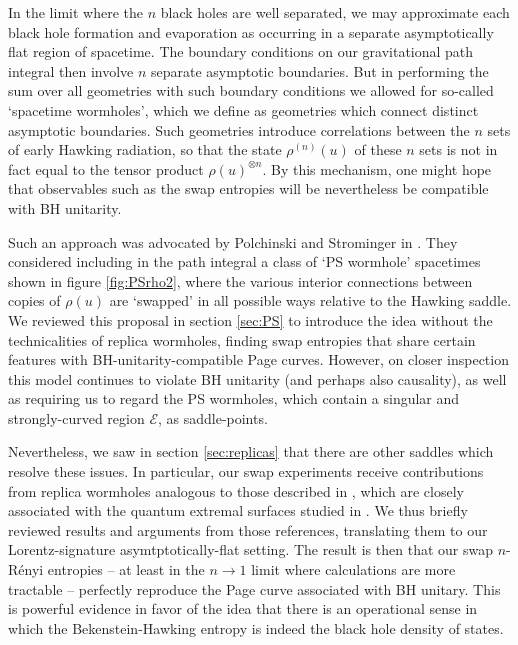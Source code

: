 \documentclass[letterpaper,12pt]{article}
\newcommand*{\evap}{\mathscr{E}} %
\begin{document}
In the limit where the $n$ black holes are well separated, we may approximate each black hole formation and evaporation as occurring in a separate asymptotically flat region of spacetime. The boundary conditions on our gravitational path integral then involve $n$ separate asymptotic boundaries. But in performing the sum over all geometries with such boundary conditions we allowed for so-called `spacetime wormholes', which we define as geometries which connect distinct asymptotic boundaries. Such geometries introduce correlations between the $n$ sets of early Hawking radiation, so that the state $\rho^{(n)}(u)$ of these $n$ sets is not in fact equal to the tensor product $\rho(u)^{\otimes n}$. By this mechanism, one might hope that observables such as the swap entropies will be nevertheless be compatible with BH unitarity.

Such an approach was advocated by Polchinski and Strominger in \cite{Polchinski:1994zs}. They considered including in the path integral a class of `PS wormhole' spacetimes shown in figure \ref{fig:PSrho2}, where the various interior connections between copies of $\rho(u)$ are `swapped' in all possible ways relative to the Hawking saddle. We reviewed this proposal in section \ref{sec:PS} to introduce the idea without the technicalities of replica wormholes, finding swap entropies that share certain features with BH-unitarity-compatible Page curves. However, on closer inspection this model continues to violate BH unitarity (and perhaps also causality), as well as requiring us to regard the PS wormholes, which contain a singular and strongly-curved region $\evap$, as saddle-points.

Nevertheless, we saw in section \ref{sec:replicas} that there are other saddles which resolve these issues.  In particular, our swap experiments receive contributions from replica wormholes analogous to those described in \cite{Almheiri:2019qdq,Penington:2019kki}, which are closely associated with the quantum extremal surfaces studied in \cite{Almheiri:2019psf,Penington:2019npb}.  We thus briefly reviewed results and arguments from those references, translating them to our Lorentz-signature asymtptotically-flat setting.  The result is then that our swap $n$-R\'enyi entropies -- at least in the $n\rightarrow 1$ limit where calculations are more tractable -- perfectly reproduce the Page curve associated with BH unitary. This is powerful evidence in favor of the idea that there is an operational sense in which the Bekenstein-Hawking entropy is indeed the black hole density of states.
\end{document}
